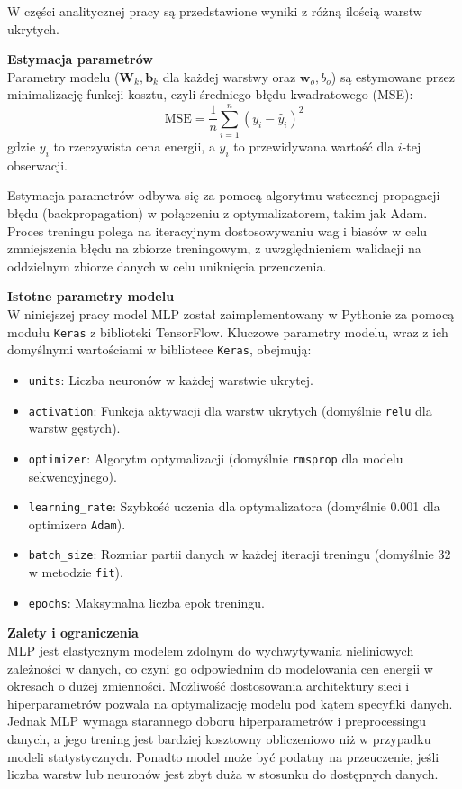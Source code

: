 W części analitycznej pracy są przedstawione wyniki z różną ilością warstw ukrytych. 

\textbf{Estymacja parametrów} \\
Parametry modelu (\( \mathbf{W}_k, \mathbf{b}_k \) dla każdej warstwy oraz \( \mathbf{w}_o, b_o \)) są estymowane przez minimalizację funkcji kosztu, czyli średniego błędu kwadratowego (MSE):
\begin{equation}
\text{MSE} = \frac{1}{n} \sum_{i=1}^n \left( y_i - \hat{y}_i \right)^2
\end{equation}
gdzie \( y_i \) to rzeczywista cena energii, a \( \hat{y}_i \) to przewidywana wartość dla \( i \)-tej obserwacji.

Estymacja parametrów odbywa się za pomocą algorytmu wstecznej propagacji błędu (backpropagation) w połączeniu z optymalizatorem, takim jak Adam. Proces treningu polega na iteracyjnym dostosowywaniu wag i biasów w celu zmniejszenia błędu na zbiorze treningowym, z uwzględnieniem walidacji na oddzielnym zbiorze danych w celu uniknięcia przeuczenia.

\textbf{Istotne parametry modelu} \\
W niniejszej pracy model MLP został zaimplementowany w Pythonie za pomocą modułu \texttt{Keras} z biblioteki TensorFlow. Kluczowe parametry modelu, wraz z ich domyślnymi wartościami w bibliotece \texttt{Keras}, obejmują:
\begin{itemize}
    \item \texttt{units}: Liczba neuronów w każdej warstwie ukrytej.
    \item \texttt{activation}: Funkcja aktywacji dla warstw ukrytych (domyślnie \texttt{relu} dla warstw gęstych).
    \item \texttt{optimizer}: Algorytm optymalizacji (domyślnie \texttt{rmsprop} dla modelu sekwencyjnego).
    \item \texttt{learning\_rate}: Szybkość uczenia dla optymalizatora (domyślnie 0.001 dla optimizera \texttt{Adam}).
    \item \texttt{batch\_size}: Rozmiar partii danych w każdej iteracji treningu (domyślnie 32 w metodzie \texttt{fit}).
    \item \texttt{epochs}: Maksymalna liczba epok treningu.
\end{itemize}

\textbf{Zalety i ograniczenia} \\
MLP jest elastycznym modelem zdolnym do wychwytywania nieliniowych zależności w danych, co czyni go odpowiednim do modelowania cen energii w okresach o dużej zmienności. Możliwość dostosowania architektury sieci i hiperparametrów pozwala na optymalizację modelu pod kątem specyfiki danych. Jednak MLP wymaga starannego doboru hiperparametrów i preprocessingu danych, a jego trening jest bardziej kosztowny obliczeniowo niż w przypadku modeli statystycznych. Ponadto model może być podatny na przeuczenie, jeśli liczba warstw lub neuronów jest zbyt duża w stosunku do dostępnych danych.
